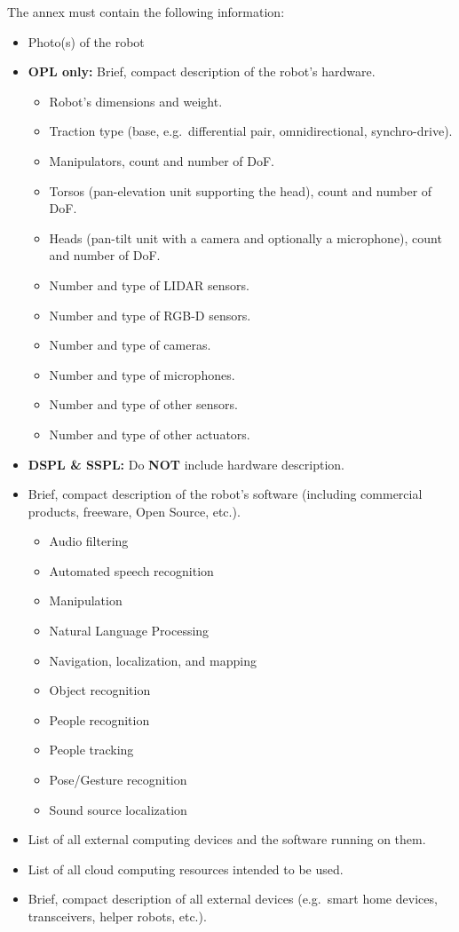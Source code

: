 \documentclass[runningheads,a4paper]{llncs}
\begin{document}
The annex must contain the following information:

\begin{itemize}[nosep]
	\item Photo(s) of the robot
	\item \textbf{OPL only:} Brief, compact description of the robot's hardware.
	\begin{itemize}[nosep]
		\item Robot's dimensions and weight.
		\item Traction type (base, e.g.~differential pair, omnidirectional, synchro-drive).
		\item Manipulators, count and number of DoF.
		\item Torsos (pan-elevation unit supporting the head), count and number of DoF.
		\item Heads (pan-tilt unit with a camera and optionally a microphone), count and number of DoF.
		\item Number and type of LIDAR sensors.
		\item Number and type of RGB-D sensors.
		\item Number and type of cameras.
		\item Number and type of microphones.
		\item Number and type of other sensors.
		\item Number and type of other actuators.
	\end{itemize}
	\item \textbf{DSPL \& SSPL:} Do \textbf{NOT} include hardware description.
	\item Brief, compact description of the robot's software (including commercial products, freeware, Open Source, etc.).
	\begin{itemize}[nosep]
		\item Audio filtering
		\item Automated speech recognition
		\item Manipulation
		\item Natural Language Processing
		\item Navigation, localization, and mapping
		\item Object recognition
		\item People recognition
		\item People tracking
		\item Pose/Gesture recognition
		\item Sound source localization
	\end{itemize}
	\item List of all external computing devices and the software running on them.
	\item List of all cloud computing resources intended to be used.
	\item Brief, compact description of all external devices (e.g.~smart home devices, transceivers, helper robots, etc.).
\end{itemize}
\end{document}
